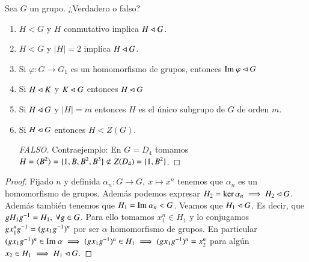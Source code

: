 \begin{ex}[H2.6]
	Sea $G$ un grupo. ¿Verdadero o falso?
	\begin{enumerate}
		\item $H < G$ y $H$ conmutativo implica $H \lhd G$.
		\item $H < G$ y $|H| = 2$ implica $H \lhd G$.
		\item Si $\varphi: G \to G_1$ es un homomorfismo de grupos, entonces $\text{Im } \varphi \lhd G$
		\item Si $H \lhd K$ y $K \lhd G$ entonces $H \lhd G$
		\item Si $H \lhd G$ y $|H| = m$ entonces $H$ es el único subgrupo de $G$ de orden $m$.
		\item Si $H \lhd G$ entonces $H < Z(G)$.
		\begin{proof}[FALSO]
			Contraejemplo: En $G = D_4$ tomamos $H = \langle B^2\rangle = \{1, B, B^2, B^3\} \not\subset Z(D_4) = \{1, B^2\}$.
		\end{proof}
	\end{enumerate}
\end{ex}

\begin{ex}[H2.10]
	\begin{proof}
		Fijado $n$ y definida $\alpha_n : G \to G,\ x \mapsto x^n$ tenemos que $\alpha_n$ es un homomorfismo de grupos. Además podemos expresar $H_2 = \ker \alpha_n \implies H_2 \lhd G$. Además también tenemos que $H_1 = \text{Im } \alpha_n < G$. Veamos que $H_1 \lhd G$. Es decir, que $gH_1g^{-1} = H_1,\ \forall g \in G$. Para ello tomamos $x_1^n \in H_1$ y lo conjugamos $gx_1^ng^{-1} = (gx_1g^{-1})^n$ por ser $\alpha$ homomorfismo de grupos. En particular $(gx_1g^{-1})^n \in \text{Im } \alpha \implies (gx_1g^{-1})^n \in H_1 \implies (gx_1g^{-1})^n = x_2^n$ para algún $x_2 \in H_1 \implies H_1 \lhd G$.
	\end{proof}
\end{ex}

